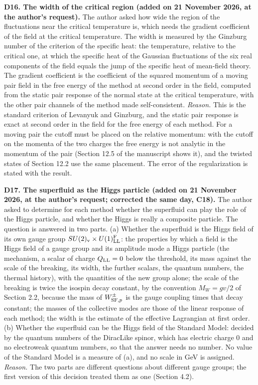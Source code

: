 \documentclass[
  10pt,
]{article}
\begin{document}
\textbf{D16. The width of the critical region (added on 21 November
2026, at the author's request).} The author asked how wide the region of
the fluctuations near the critical temperature is, which needs the
gradient coefficient of the field at the critical temperature. The width
is measured by the Ginzburg number of the criterion of the specific
heat: the temperature, relative to the critical one, at which the
specific heat of the Gaussian fluctuations of the six real components of
the field equals the jump of the specific heat of mean-field theory. The
gradient coefficient is the coefficient of the squared momentum of a
moving pair field in the free energy of the method at second order in
the field, computed from the static pair response of the normal state at
the critical temperature, with the other pair channels of the method
made self-consistent. \emph{Reason.} This is the standard criterion of
Levanyuk and Ginzburg, and the static pair response is exact at second
order in the field for the free energy of each method. For a moving pair
the cutoff must be placed on the relative momentum: with the cutoff on
the momenta of the two charges the free energy is not analytic in the
momentum of the pair (Section 12.5 of the manuscript shows it), and the
twisted states of Section 12.2 use the same placement. The error of the
regularization is stated with the result.

\textbf{D17. The superfluid as the Higgs particle (added on 21 November
2026, at the author's request; corrected the same day, C18).} The author
asked to determine for each method whether the superfluid can play the
role of the Higgs particle, and whether the Higgs is really a composite
particle. The question is answered in two parts. (a) Whether the
superfluid is the Higgs field of its own gauge group
\(SU(2)_{\rm v}\times U(1)^{\rm F}_{\rm LL}\): the properties by which a
field is the Higgs field of a gauge group and its amplitude mode a Higgs
particle (the mechanism, a scalar of charge \(Q_{\rm LL}=0\) below the
threshold, its mass against the scale of the breaking, its width, the
further scalars, the quantum numbers, the thermal history), with the
quantities of the new group alone; the scale of the breaking is twice
the isospin decay constant, by the convention \(M_W=gv/2\) of Section
2.2, because the mass of \(W^\pm_{{\rm SF},p}\) is the gauge coupling
times that decay constant; the masses of the collective modes are those
of the linear response of each method; the width is the estimate of the
effective Lagrangian at first order. (b) Whether the superfluid can be
the Higgs field of the Standard Model: decided by the quantum numbers of
the DiracLike spinor, which has electric charge 0 and no electroweak
quantum numbers, so that the answer needs no number. No value of the
Standard Model is a measure of (a), and no scale in GeV is assigned.
\emph{Reason.} The two parts are different questions about different
gauge groups; the first version of this decision treated them as one
(Section 4.2).
\end{document}
